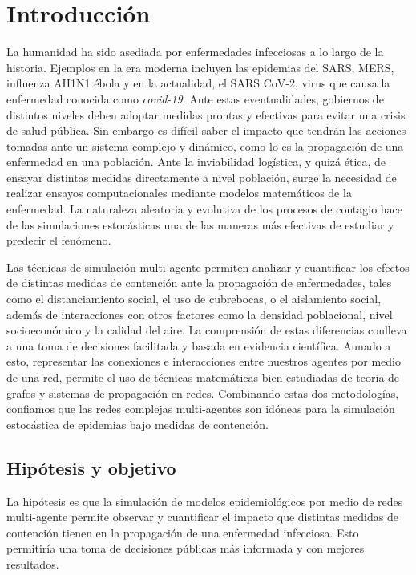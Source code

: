 \chapter{Introducción}

La humanidad ha sido asediada por enfermedades infecciosas a lo largo de la historia. Ejemplos en la era moderna incluyen las epidemias del SARS, MERS, influenza AH1N1 ébola y en la actualidad, el SARS CoV-2, virus que causa la enfermedad conocida como \textit{covid-19}. Ante estas eventualidades, gobiernos de distintos niveles deben adoptar medidas prontas y efectivas para evitar una crisis de salud pública. Sin embargo es difícil saber el impacto que tendrán las acciones tomadas ante un sistema complejo y dinámico, como lo es la propagación de una enfermedad en una población. Ante la inviabilidad logística, y quizá ética, de ensayar distintas medidas directamente a nivel población, surge la necesidad de realizar ensayos computacionales mediante modelos matemáticos de la enfermedad. La naturaleza aleatoria y evolutiva de los procesos de contagio hace de las simulaciones estocásticas una de las maneras más efectivas de estudiar y predecir el fenómeno.

Las técnicas de simulación multi-agente permiten analizar y cuantificar los efectos de distintas medidas de contención ante la propagación de enfermedades, tales como el distanciamiento social, el uso de cubrebocas,  o el aislamiento social, además de interacciones con otros factores como la densidad poblacional, nivel socioeconómico y la calidad del aire. La comprensión de estas diferencias conlleva a una toma de decisiones facilitada y basada en evidencia científica. Aunado a esto, representar las conexiones e interacciones entre nuestros agentes por medio de una red, permite el uso de técnicas matemáticas bien estudiadas de teoría de grafos y sistemas de propagación en redes. Combinando estas dos metodologías, confiamos que las redes complejas multi-agentes son idóneas para la simulación estocástica de epidemias bajo medidas de contención.

\section{Hipótesis y objetivo}
La hipótesis es que la simulación de modelos epidemiológicos por medio de redes multi-agente permite observar y cuantificar el impacto que distintas medidas de contención tienen en la propagación de una enfermedad infecciosa. Esto permitiría una toma de decisiones públicas más informada y con mejores resultados.

